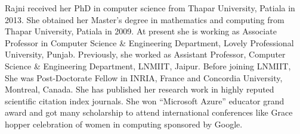 Rajni received her PhD in computer science from Thapar University, Patiala in 2013. She obtained her Master's degree in mathematics and computing from Thapar University, Patiala in 2009. At present she is working as Associate Professor in Computer Science \& Engineering Department, Lovely Professional University, Punjab. Previously, she worked as Assistant Professor, Computer Science \& Engineering Department, LNMIIT, Jaipur. Before joining LNMIIT, She was Post-Doctorate Fellow in INRIA, France and Concordia University, Montreal, Canada. She has published her research work in highly reputed scientific citation index journals. She won ``Microsoft Azure'' educator grand award and got many scholarship to attend international conferences like Grace hopper celebration of women in computing sponsored by Google.